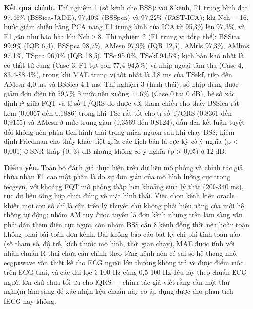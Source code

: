 \documentclass[12pt,a4paper]{article}
\begin{document}
\noindent \textbf{Kết quả chính.} Thí nghiệm 1 (số kênh cho BSS): với 8 kênh, F1 trung bình đạt 97,46\% (BSSica-JADE), 97,40\% (BSSpca) và 97,22\% (FAST-ICA); khi Nch = 16, bước giảm chiều bằng PCA nâng F1 trung bình của ICA từ 95,3\% lên 97,3\%, và F1 gần như bão hòa khi Nch ≥ 8. Thí nghiệm 2 (F1 trung vị tổng thể): BSSica 99,9\% (IQR 6,4), BSSpca 98,7\%, AMesn 97,9\% (IQR 12,5), AMrls 97,3\%, AMlms 97,1\%, TSpca 96,0\% (IQR 18,5), TSc 95,0\%, TSekf 94,5\%; kịch bản khó nhất là co thắt tử cung (Case 3, F1 tụt còn 77,4-94,5\%) và nhịp ngoại tâm thu (Case 4, 83,4-88,4\%), trong khi MAE trung vị tốt nhất là 3,8 ms của TSekf, tiếp đến AMesn 4,0 ms và BSSica 4,1 ms. Thí nghiệm 3 (hình thái): số nhịp dùng được giảm đơn điệu từ 69,7\% ở mức nền xuống 11,6\% (Case 0 tại 0 dB), hệ số xác định r² giữa FQT và tỉ số T/QRS đo được với tham chiếu cho thấy BSSica rất kém (0,0067 đến 0,1886) trong khi TSc rất tốt cho tỉ số T/QRS (0,8361 đến 0,9155) và AMesn ở mức trung gian (0,3569 đến 0,8124), dẫn đến kết luận tuyệt đối không nên phân tích hình thái trong miền nguồn sau khi chạy BSS; kiểm định Friedman cho thấy khác biệt giữa các kịch bản là cực kỳ có ý nghĩa (p < 0,001) ở SNR thấp \{0, 3\} dB nhưng không có ý nghĩa (p > 0,05) ở 12 dB.\par\vspace{3pt}
\noindent \textbf{Điểm yếu.} Toàn bộ đánh giá thực hiện trên dữ liệu mô phỏng và chính tác giả thừa nhận F1 cao một phần là do sự đơn giản của mô hình lưỡng cực trong fecgsyn, với khoảng FQT mô phỏng thấp hơn khoảng sinh lý thật (200-340 ms), tức dữ liệu tổng hợp chưa đúng về mặt hình thái. Việc chọn kênh kiểu oracle khiến mọi con số chỉ là cận trên lý thuyết chứ không phải hiệu năng của một hệ thống tự động; nhóm AM tuy được tuyên là đơn kênh nhưng trên lâm sàng vẫn phải dán thêm điện cực ngực, còn nhóm BSS cần 8 kênh đồng thời nên hoàn toàn không phải bài toán đơn kênh. Bài không báo cáo bất kỳ chi phí tính toán nào (số tham số, độ trễ, kích thước mô hình, thời gian chạy), MAE được tính với nhãn chuẩn R thai chưa căn chỉnh theo từng kênh nên có sai số hệ thống nhỏ, ecgpuwave vốn thiết kế cho ECG người lớn thường không trả về được điểm mốc trên ECG thai, và các dải lọc 3-100 Hz cùng 0,5-100 Hz đều lấy theo chuẩn ECG người lớn chứ chưa tối ưu cho fQRS — chính tác giả viết rằng cần một thử nghiệm lâm sàng để xác nhận liệu chuẩn này có áp dụng được cho phân tích fECG hay không.\par\vspace{3pt}
\end{document}
